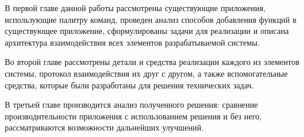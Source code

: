 В первой главе данной работы рассмотрены существующие приложения, использующие
палитру команд, проведен анализ способов добавления функций в существующее
приложение, сформулированы задачи для реализации и описана архитектура
взаимодействия всех элементов разрабатываемой системы.

Во второй главе рассмотрены детали и средства реализации каждого из элементов
системы, протокол взаимодействия их друг с другом, а также вспомогательные
средства, которые были разработаны для решения технических задач.

В третьей главе производится анализ полученного решения: сравнение
производительности приложения с использованием решения и без него,
рассматриваются возможности дальнейших улучшений.
